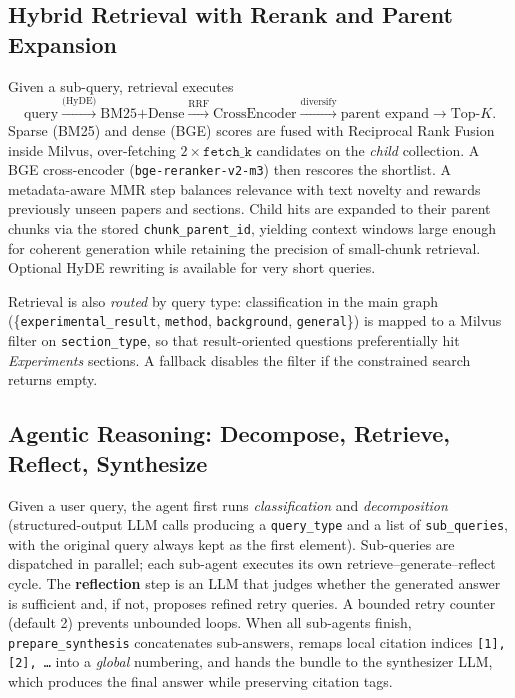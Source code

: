 \documentclass[11pt]{article}
\begin{document}
\subsection{Hybrid Retrieval with Rerank and Parent Expansion}
Given a sub-query, retrieval executes
\[
\text{query} \xrightarrow{\text{(HyDE)}} \text{BM25+Dense} \xrightarrow{\text{RRF}} \text{CrossEncoder} \xrightarrow{\text{diversify}} \text{parent expand} \xrightarrow{} \text{Top-}K.
\]
Sparse (BM25) and dense (BGE) scores are fused with Reciprocal Rank Fusion inside Milvus, over-fetching $2\!\times\!\texttt{fetch\_k}$ candidates on the \emph{child} collection. A BGE cross-encoder (\texttt{bge-reranker-v2-m3}) then rescores the shortlist. A metadata-aware MMR step balances relevance with text novelty and rewards previously unseen papers and sections. Child hits are expanded to their parent chunks via the stored \texttt{chunk\_parent\_id}, yielding context windows large enough for coherent generation while retaining the precision of small-chunk retrieval. Optional HyDE rewriting is available for very short queries.

Retrieval is also \emph{routed} by query type: classification in the main graph (\{\texttt{experimental\_result}, \texttt{method}, \texttt{background}, \texttt{general}\}) is mapped to a Milvus filter on \texttt{section\_type}, so that result-oriented questions preferentially hit \textit{Experiments} sections. A fallback disables the filter if the constrained search returns empty.

\subsection{Agentic Reasoning: Decompose, Retrieve, Reflect, Synthesize}
Given a user query, the agent first runs \emph{classification} and \emph{decomposition} (structured-output LLM calls producing a \texttt{query\_type} and a list of \texttt{sub\_queries}, with the original query always kept as the first element). Sub-queries are dispatched in parallel; each sub-agent executes its own retrieve--generate--reflect cycle. The \textbf{reflection} step is an LLM that judges whether the generated answer is sufficient and, if not, proposes refined retry queries. A bounded retry counter (default 2) prevents unbounded loops. When all sub-agents finish, \texttt{prepare\_synthesis} concatenates sub-answers, remaps local citation indices \texttt{[1], [2], \dots} into a \emph{global} numbering, and hands the bundle to the synthesizer LLM, which produces the final answer while preserving citation tags.
\end{document}
